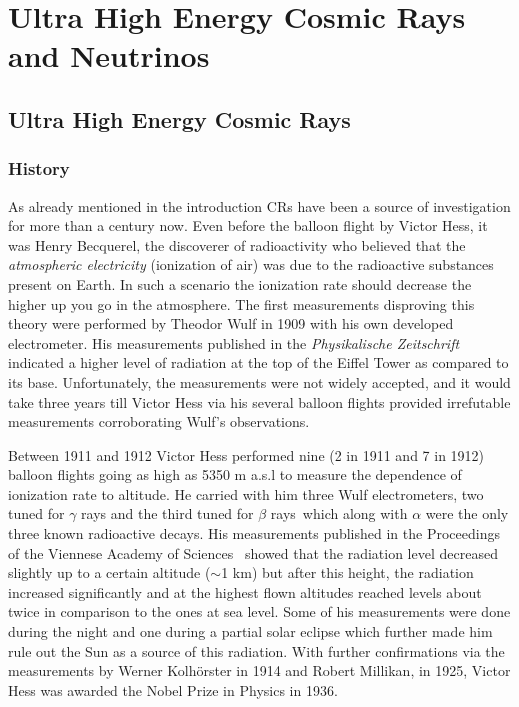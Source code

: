 
\chapter{Ultra High Energy Cosmic Rays and Neutrinos}
\label{chap:crnNu}

\section{Ultra High Energy Cosmic Rays}
\label{sec:UHECR}
\subsection{History}
\label{subsec:crhist}
As already mentioned in the introduction \glspl{CR} have been a source of investigation for more than a century now. Even before the balloon flight by Victor Hess, it was Henry Becquerel, the discoverer of radioactivity who believed that the \textit{atmospheric electricity} (ionization of air) was due to the radioactive substances present on Earth. In such a scenario the ionization rate should decrease the higher up you go in the atmosphere. The first measurements disproving this theory were performed by Theodor Wulf in 1909 with his own developed electrometer. His measurements published in the \textit{Physikalische Zeitschrift} indicated a higher level of radiation at the top of the Eiffel Tower as compared to its base. Unfortunately, the measurements were not widely accepted, and it would take three years till Victor Hess via his several balloon flights provided irrefutable measurements corroborating Wulf's observations.

Between 1911 and 1912 Victor Hess performed nine (2 in 1911 and 7 in 1912) balloon flights going as high as 5350 m a.s.l to measure the dependence of ionization rate to altitude. He carried with him three Wulf electrometers, two tuned for $\gamma$ rays and the third tuned for $\beta$ rays~\cite{hess2018observationspenetratingradiationseven}which along with $\alpha$ were the only three known radioactive decays. His measurements published in the Proceedings of the Viennese Academy of Sciences~\cite{Hess:1912srp} showed that the radiation level decreased slightly up to a certain altitude ($\sim$1 km) but after this height, the radiation increased significantly and at the highest flown altitudes reached levels about twice in comparison to the ones at sea level. Some of his measurements were done during the night and one during a partial solar eclipse which further made him rule out the Sun as a source of this radiation. With further confirmations via the measurements by Werner Kolhörster in 1914 and Robert Millikan, in 1925, Victor Hess was awarded the Nobel Prize in Physics in 1936. 

